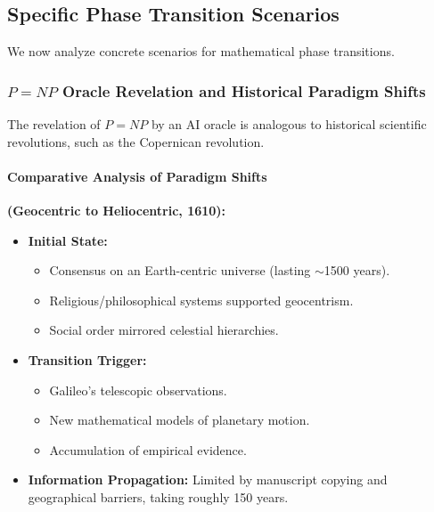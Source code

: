 \documentclass[11pt]{article}
\begin{document}
\subsection{Specific Phase Transition Scenarios}

We now analyze concrete scenarios for mathematical phase transitions.

\subsubsection{$P=NP$ Oracle Revelation and Historical Paradigm Shifts}

The revelation of $P=NP$ by an AI oracle is analogous to historical scientific revolutions, such as the Copernican revolution.

\paragraph{Comparative Analysis of Paradigm Shifts}
\textbf{(Geocentric to Heliocentric, 1610):}
\begin{itemize}
    \item \textbf{Initial State:} 
    \begin{itemize}
        \item Consensus on an Earth-centric universe (lasting $\sim$1500 years).
        \item Religious/philosophical systems supported geocentrism.
        \item Social order mirrored celestial hierarchies.
    \end{itemize}
    \item \textbf{Transition Trigger:} 
    \begin{itemize}
        \item Galileo's telescopic observations.
        \item New mathematical models of planetary motion.
        \item Accumulation of empirical evidence.
    \end{itemize}
    \item \textbf{Information Propagation:} Limited by manuscript copying and geographical barriers, taking roughly 150 years.
\end{itemize}
\end{document}
